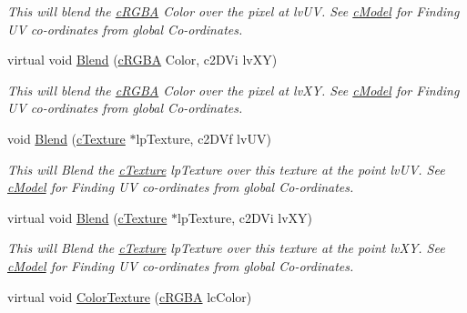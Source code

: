 \begin{DoxyCompactItemize}
\begin{DoxyCompactList}\small\item\em This will blend the \hyperlink{classc_r_g_b_a}{cRGBA} Color over the pixel at lvUV. See \hyperlink{classc_model}{cModel} for Finding UV co-\/ordinates from global Co-\/ordinates. \end{DoxyCompactList}\item 
\hypertarget{classc_texture_a1f8b9dad40433c9aaa829b7489c20520}{
virtual void \hyperlink{classc_texture_a1f8b9dad40433c9aaa829b7489c20520}{Blend} (\hyperlink{classc_r_g_b_a}{cRGBA} Color, c2DVi lvXY)}
\label{classc_texture_a1f8b9dad40433c9aaa829b7489c20520}

\begin{DoxyCompactList}\small\item\em This will blend the \hyperlink{classc_r_g_b_a}{cRGBA} Color over the pixel at lvXY. See \hyperlink{classc_model}{cModel} for Finding UV co-\/ordinates from global Co-\/ordinates. \end{DoxyCompactList}\item 
\hypertarget{classc_texture_aad5ae3562f9d0d28a507ec4dcd97624f}{
void \hyperlink{classc_texture_aad5ae3562f9d0d28a507ec4dcd97624f}{Blend} (\hyperlink{classc_texture}{cTexture} $\ast$lpTexture, c2DVf lvUV)}
\label{classc_texture_aad5ae3562f9d0d28a507ec4dcd97624f}

\begin{DoxyCompactList}\small\item\em This will Blend the \hyperlink{classc_texture}{cTexture} lpTexture over this texture at the point lvUV. See \hyperlink{classc_model}{cModel} for Finding UV co-\/ordinates from global Co-\/ordinates. \end{DoxyCompactList}\item 
\hypertarget{classc_texture_a58a6598a9dea1feb759279810dac47ce}{
virtual void \hyperlink{classc_texture_a58a6598a9dea1feb759279810dac47ce}{Blend} (\hyperlink{classc_texture}{cTexture} $\ast$lpTexture, c2DVi lvXY)}
\label{classc_texture_a58a6598a9dea1feb759279810dac47ce}

\begin{DoxyCompactList}\small\item\em This will Blend the \hyperlink{classc_texture}{cTexture} lpTexture over this texture at the point lvXY. See \hyperlink{classc_model}{cModel} for Finding UV co-\/ordinates from global Co-\/ordinates. \end{DoxyCompactList}\item 
\hypertarget{classc_texture_aacade6a903d6b97d6894c4a2fdf283e5}{
virtual void \hyperlink{classc_texture_aacade6a903d6b97d6894c4a2fdf283e5}{ColorTexture} (\hyperlink{classc_r_g_b_a}{cRGBA} lcColor)}
\label{classc_texture_aacade6a903d6b97d6894c4a2fdf283e5}


\end{DoxyCompactItemize}
